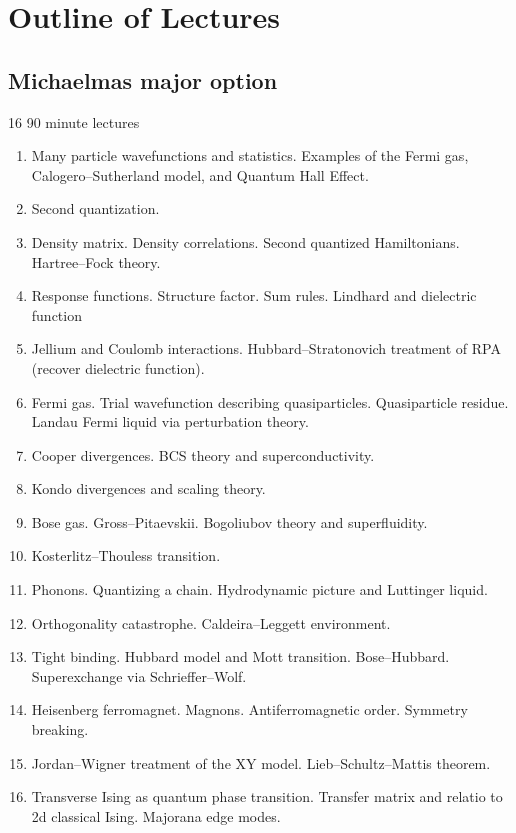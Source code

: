 \section{Outline of Lectures}

\subsection{Michaelmas major option}

16 90 minute lectures

\begin{enumerate}
\item Many particle wavefunctions and statistics. Examples of the Fermi gas, Calogero--Sutherland model, and Quantum Hall Effect.

\item Second quantization. 

\item Density matrix. Density correlations. Second quantized Hamiltonians. Hartree--Fock theory.

\item Response functions. Structure factor. Sum rules. Lindhard and dielectric function

\item Jellium and Coulomb interactions. Hubbard--Stratonovich treatment of RPA (recover dielectric function).

\item Fermi gas. Trial wavefunction describing quasiparticles. Quasiparticle residue. Landau Fermi liquid via perturbation theory. 

\item Cooper divergences. BCS theory and superconductivity. 

\item Kondo divergences and scaling theory.

\item Bose gas. Gross--Pitaevskii. Bogoliubov theory and superfluidity.

\item Kosterlitz--Thouless transition.

\item Phonons. Quantizing a chain. Hydrodynamic picture and Luttinger liquid.

\item Orthogonality catastrophe. Caldeira--Leggett environment.

\item Tight binding. Hubbard model and Mott transition. Bose--Hubbard. Superexchange via Schrieffer--Wolf.

\item Heisenberg ferromagnet. Magnons. Antiferromagnetic order. Symmetry breaking.

\item Jordan--Wigner treatment of the XY model. Lieb--Schultz--Mattis theorem.

\item Transverse Ising as quantum phase transition. Transfer matrix and relatio to 2d classical Ising. Majorana edge modes.

\end{enumerate}

